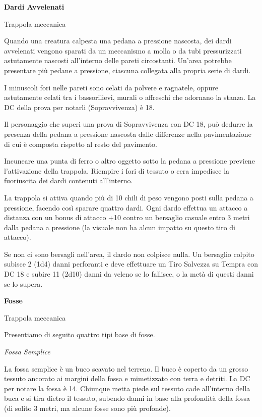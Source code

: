 \begin{multicols}{2}
\medskip

\textbf{Dardi Avvelenati}

Trappola meccanica

Quando una creatura calpesta una pedana a pressione nascosta, dei dardi avvelenati vengono sparati da un meccanismo a molla o da tubi pressurizzati astutamente nascosti all'interno delle pareti circostanti. Un'area potrebbe presentare più pedane a pressione, ciascuna collegata alla propria serie di dardi.

I minuscoli fori nelle pareti sono celati da polvere e ragnatele, oppure astutamente celati tra i bassorilievi, murali o affreschi che adornano la stanza. La DC della prova per notarli (Sopravvivenza) è 18.

Il personaggio che superi una prova di Sopravvivenza con DC 18, può dedurre la presenza della pedana a pressione nascosta dalle differenze nella pavimentazione di cui è composta rispetto al resto del pavimento.

Incuneare una punta di ferro o altro oggetto sotto la pedana a pressione previene l'attivazione della trappola. Riempire i fori di tessuto o cera impedisce la fuoriuscita dei dardi contenuti all'interno.

La trappola si attiva quando più di 10 chili di peso vengono posti sulla pedana a pressione, facendo così sparare quattro dardi. Ogni dardo effettua un attacco a distanza con un bonus di attacco +10 contro un bersaglio casuale entro 3 metri dalla pedana a pressione (la visuale non ha alcun impatto su questo tiro di attacco).

Se non ci sono bersagli nell'area, il dardo non colpisce nulla. Un bersaglio colpito subisce 2 (1d4) danni perforanti e deve effettuare un Tiro Salvezza su Tempra con DC 18 e subire 11 (2d10) danni da veleno se lo fallisce, o la metà di questi danni se lo supera.


\medskip

\textbf{Fosse}

Trappola meccanica

Presentiamo di seguito quattro tipi base di fosse.

\medskip

\emph{Fossa Semplice}

La fossa semplice è un buco scavato nel terreno. Il buco è coperto da un grosso tessuto ancorato ai margini della fossa e mimetizzato con terra e detriti.
La DC per notare la fossa è 14. Chiunque metta piede sul tessuto cade all'interno della buca e si tira dietro il tessuto, subendo danni in base alla profondità della fossa (di solito 3 metri, ma alcune fosse sono più profonde).


\end{multicols}
